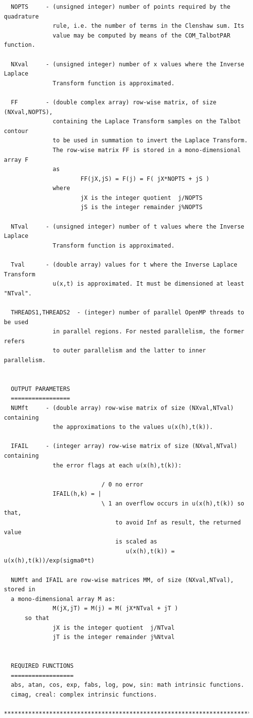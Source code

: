 \documentclass[a4paper,10pt]{report}%
\begin{document}
\begin{lstlisting}
  NOPTS     - (unsigned integer) number of points required by the quadrature
              rule, i.e. the number of terms in the Clenshaw sum. Its
              value may be computed by means of the COM_TalbotPAR function.

  NXval     - (unsigned integer) number of x values where the Inverse Laplace
              Transform function is approximated.

  FF        - (double complex array) row-wise matrix, of size (NXval,NOPTS),
              containing the Laplace Transform samples on the Talbot contour
              to be used in summation to invert the Laplace Transform.
              The row-wise matrix FF is stored in a mono-dimensional array F
              as
                      FF(jX,jS) = F(j) = F( jX*NOPTS + jS )
              where
                      jX is the integer quotient  j/NOPTS
                      jS is the integer remainder j%NOPTS

  NTval     - (unsigned integer) number of t values where the Inverse Laplace
              Transform function is approximated.

  Tval      - (double array) values for t where the Inverse Laplace Transform
              u(x,t) is approximated. It must be dimensioned at least "NTval".

  THREADS1,THREADS2  - (integer) number of parallel OpenMP threads to be used
              in parallel regions. For nested parallelism, the former refers
              to outer parallelism and the latter to inner parallelism.


  OUTPUT PARAMETERS
  =================
  NUMft     - (double array) row-wise matrix of size (NXval,NTval) containing
              the approximations to the values u(x(h),t(k)).

  IFAIL     - (integer array) row-wise matrix of size (NXval,NTval) containing
              the error flags at each u(x(h),t(k)):

                            / 0 no error
              IFAIL(h,k) = |
                            \ 1 an overflow occurs in u(x(h),t(k)) so that,
                                to avoid Inf as result, the returned value
                                is scaled as
                                   u(x(h),t(k)) = u(x(h),t(k))/exp(sigma0*t)

  NUMft and IFAIL are row-wise matrices MM, of size (NXval,NTval), stored in
  a mono-dimensional array M as:
              M(jX,jT) = M(j) = M( jX*NTval + jT )
      so that
              jX is the integer quotient  j/NTval
              jT is the integer remainder j%Ntval


  REQUIRED FUNCTIONS
  ==================
  abs, atan, cos, exp, fabs, log, pow, sin: math intrinsic functions.
  cimag, creal: complex intrinsic functions.

*****************************************************************************\
\end{lstlisting}
\end{document}

